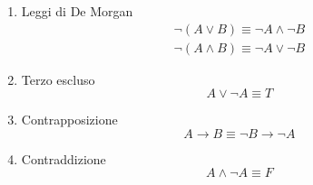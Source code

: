 \begin{enumerate}
    \item Leggi di De Morgan
            \begin{align*}
                \neg (A \lor B)  \equiv  \neg A \land \neg B \\
                \neg(A \land B)  \equiv  \neg A \lor \neg B
            \end{align*}
    \item Terzo escluso
            \begin{equation*}
                A \lor \neg A \equiv T
            \end{equation*}
    \item Contrapposizione
            \begin{equation*}
                A \rightarrow B \equiv \neg B \rightarrow \neg A
            \end{equation*}
    \item Contraddizione
            \begin{equation*}
                A \land \neg A \equiv F
            \end{equation*}
\end{enumerate}

